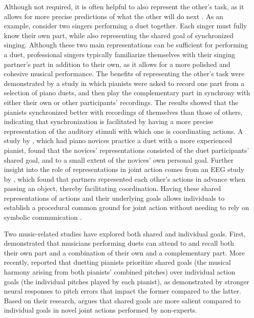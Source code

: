 \documentclass[10pt,a4paper,onecolumn]{article}
\begin{document}
Although not required, it is often helpful to also represent the other's task, as it allows for more precise predictions of what the other will do next \autocite{boltSensoryAttenuationAuditory2021,wenkeWhatSharedJoint2011}. As an example, consider two singers performing a duet together. Each singer must fully know their own part, while also representing the shared goal of synchronized singing. Although these two main representations can be sufficient for performing a duet, professional singers typically familiarize themselves with their singing partner's part in addition to their own, as it allows for a more polished and cohesive musical performance. The benefits of representing the other's task were demonstrated by a study \autocite{kellerPianistsDuetBetter2007} in which pianists were asked to record one part from a selection of piano duets, and then play the complementary part in synchrony with either their own or other participants' recordings. The results showed that the pianists synchronized better with recordings of themselves than those of others, indicating that synchronization is facilitated by having a more precise representation of the auditory stimuli with which one is coordinating actions. A study by \textcite{loehrSoundYouMe2016}, which had piano novices practice a duet with a more experienced pianist, found that the novices' representations consisted of the duet participants' shared goal, and to a small extent of the novices' own personal goal. Further insight into the role of representations in joint action comes from an EEG study by \textcite{kourtisPredictiveRepresentationOther2012}, which found that partners represented each other's actions in advance when passing an object, thereby facilitating coordination. Having these shared representations of actions and their underlying goals allows individuals to establish a procedural common ground for joint action without needing to rely on symbolic communication \autocite{sebanzJointActionBodies2006}.

Two music-related studies have explored both shared and individual goals. First, \textcite{kellerMusicalMeterAttention2005} demonstrated that musicians performing duets can attend to and recall both their own part and a combination of their own and a complementary part. More recently, \textcite{loehrMonitoringIndividualJoint2013} reported that duetting pianists prioritize shared goals (the musical harmony arising from both pianists' combined pitches) over individual action goals (the individual pitches played by each pianist), as demonstrated by stronger neural responses to pitch errors that impact the former compared to the latter. Based on their research, \textcite{loehrSoundYouMe2016} argues that shared goals are more salient compared to individual goals in novel joint actions performed by non-experts.
\end{document}
